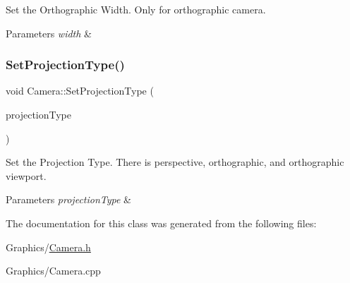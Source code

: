 Set the Orthographic Width. Only for orthographic camera. 


\begin{DoxyParams}{Parameters}
{\em width} & \\
\hline
\end{DoxyParams}
\mbox{\label{classCamera_a8757dff50ae7715a05cb24596e008021}} 
\subsubsection{\texorpdfstring{Set\+Projection\+Type()}{SetProjectionType()}}
{\footnotesize\ttfamily void Camera\+::\+Set\+Projection\+Type (\begin{DoxyParamCaption}\item[{Camera\+Projection\+Type}]{projection\+Type }\end{DoxyParamCaption})}



Set the Projection Type. There is perspective, orthographic, and orthographic viewport. 


\begin{DoxyParams}{Parameters}
{\em projection\+Type} & \\
\hline
\end{DoxyParams}


The documentation for this class was generated from the following files\+:\begin{DoxyCompactItemize}
\item 
Graphics/\hyperlink{Camera_8h}{Camera.\+h}\item 
Graphics/Camera.\+cpp\end{DoxyCompactItemize}

